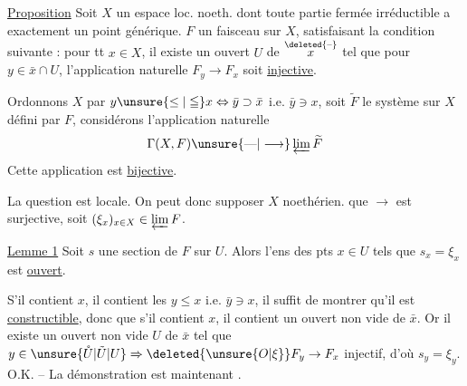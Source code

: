 \uline{Proposition} Soit $X$ un espace loc. noeth. dont toute partie fermée irréductible a exactement un point générique.  $F$ un faisceau sur $X$, satisfaisant la condition suivante : pour tt $x\in X$, il existe un   ouvert  $U$ de $\overset{\deleted{\text{--}}}{x}$ tel que pour  $y\in\bar{x}\cap U$, l'application naturelle $F_y\to F_x$ soit \uline{injective}. 

 Ordonnons $X$ par $y\unsure{\leq|\leqq}x\Leftrightarrow\bar{y}\supset\bar{x}$ i.e. $\bar{y}\ni x$, soit $\widetilde F$ le  système   sur $X$ défini par $F$, considérons l'application naturelle
\[
\Gamma(X,F)\unsure{\text{---}|\longrightarrow}\varprojlim\widetilde F
\]
Cette application est \uline{bijective}.

La question est locale. On peut donc supposer $X$ noethérien.   que $\longrightarrow$ est surjective, soit $(\xi_x)_{x\in X}\in\varprojlim F$.

\uline{Lemme 1} Soit $s$ une section de $F$ sur $U$. Alors l'ens des pts $x\in U$ tels que $s_x=\xi_x$ est \uline{ouvert}.

S'il contient $x$, il contient les $y\leq x$ i.e.  $\bar{y}\ni x$, il suffit de montrer qu'il est \uline{constructible}, donc que s'il contient $x$, il contient  un ouvert non vide de $\bar{x}$. Or il existe un ouvert non vide $U$ de $\bar{x}$ tel que $y\in\unsure{\mathring U|\tilde U|U}\Rightarrow \deleted{\unsure{O|\xi}}F_y\to F_x$ injectif, d'où $s_y=\xi_y$. O.K. -- La démonstration est maintenant .
